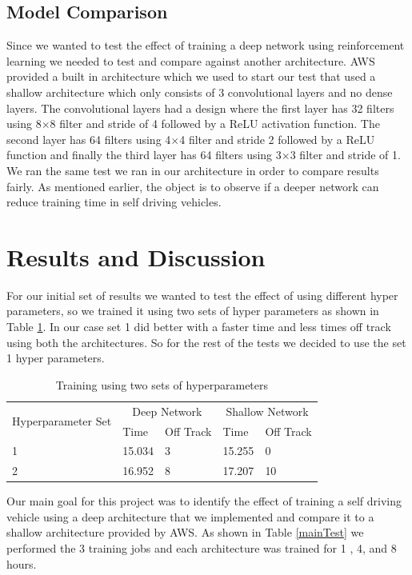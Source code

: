 \documentclass[journal]{IEEEtran}
\begin{document}
\subsection{Model Comparison}
Since we wanted to test the effect of training a deep network using reinforcement learning we needed to test and compare against another architecture.  AWS provided a built in architecture which we used to start our test that used a shallow architecture which only consists of 3 convolutional layers and no dense layers. The convolutional layers had a design where the first layer has 32 filters using 8$\times$8 filter and stride of 4 followed by a ReLU activation function.  The second layer has 64 filters using 4$\times$4 filter and stride 2 followed by a ReLU function and finally the third layer has 64 filters using 3$\times$3 filter and stride of 1.  We ran the same test we ran in our architecture in order to compare results fairly.  As mentioned earlier, the object is to observe if a deeper network can reduce training time in self driving vehicles.

\section{Results and Discussion}
For our initial set of results we wanted to test the effect of using different hyper parameters, so we trained it using two sets of hyper parameters as shown in Table \ref{twoHyperSets}.  In our case set 1 did better with a faster time and less times off track using both the architectures.  So for the rest of the tests we decided to use the set 1 hyper parameters.

\begin{table}
\centering
\caption{Training using two sets of hyperparameters}
\begin{tabular}{ |p{3cm}|p{1cm}|p{1cm}|p{1cm}|p{1cm}|  }
\hline
\multirow{2}{4em}{Hyperparameter Set} & \multicolumn{2}{|c|}{Deep Network} & \multicolumn{2}{|c|}{Shallow Network} \\
\cline{2-5}
 & Time & Off Track & Time & Off Track \\
\hline
1 & 15.034 & 3  & 15.255 & 0 \\
\hline
 2 & 16.952 & 8  & 17.207 & 10 \\
\hline
\end{tabular}
\label{twoHyperSets}
\end{table}

Our main goal for this project was to identify the effect of training a self driving vehicle using a deep architecture that we implemented and compare it to a shallow architecture provided by AWS.  As shown in Table \ref{mainTest} we performed the 3 training jobs and each architecture was trained for 1 , 4, and 8 hours. 
\end{document}
